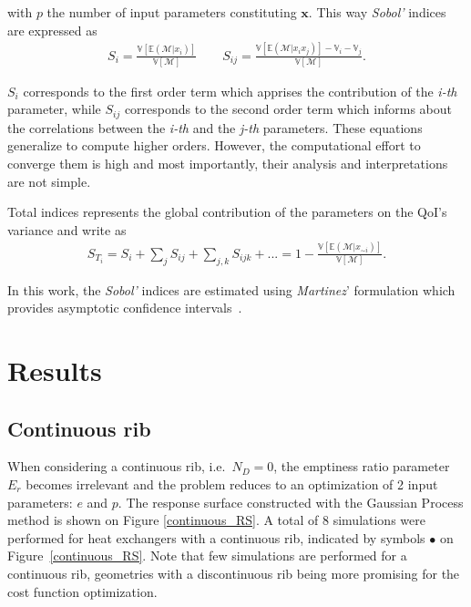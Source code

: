 \noindent with $p$ the number of input parameters constituting $\mathbf{x}$. This way \textit{Sobol'} indices are expressed as
\begin{align}
S_i = \frac{\mathbb{V}[\mathbb{E}(\mathcal{M}|x_i)]}{\mathbb{V}[\mathcal{M}]}\qquad S_{ij} = \frac{\mathbb{V}[\mathbb{E}(\mathcal{M}|x_i x_j)] - \mathbb{V}_i - \mathbb{V}_j}{\mathbb{V}[\mathcal{M}]}.
\end{align}

\noindent $S_{i}$ corresponds to the first order term which apprises the contribution of the \textit{i-th} parameter, while $S_{ij}$ corresponds to the second order term which informs about the correlations between the \textit{i-th} and the \textit{j-th} parameters. These equations generalize to compute higher orders. However, the computational effort to converge them is high and most importantly, their analysis and interpretations are not simple.

Total indices represents the global contribution of the parameters on the QoI's variance and write as
\begin{align}
S_{T_i} = S_i + \sum_j S_{ij} + \sum_{j,k} S_{ijk} + ... = 1 - \frac{\mathbb{V}[\mathbb{E}(\mathcal{M}|x_{\sim i})]}{\mathbb{V}[\mathcal{M}]}.
\end{align}

In this work, the \emph{Sobol'} indices are estimated using \textit{Martinez}' formulation which provides asymptotic confidence intervals~\cite{baudin2016}.

\section{Results}
\label{sec:results}

\subsection{Continuous rib}
\label{sec:continuous_rib}

When considering a continuous rib, i.e.~$N_D=0$, the emptiness ratio parameter $E_r$ becomes irrelevant and the problem reduces to an optimization of 2 input parameters: $e$ and $p$. The response surface constructed with the Gaussian Process method is shown on Figure \ref{continuous_RS}. A total of 8 simulations were performed for heat exchangers with a continuous rib, indicated by symbols $\bullet$ on Figure~\ref{continuous_RS}. Note that few simulations are performed for a continuous rib, geometries with a discontinuous rib being more promising for the cost function optimization.\\

